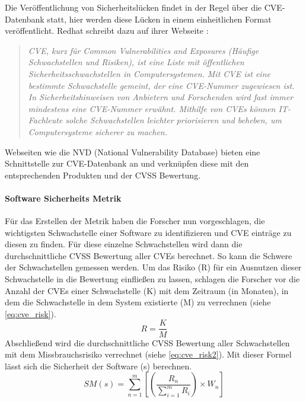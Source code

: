 \documentclass[12pt, a4paper, ngerman]{article}
\begin{document}
Die Veröffentlichung von Sicherheitslücken findet in der Regel über die CVE-Datenbank statt, 
hier werden diese Lücken in einem einheitlichen Format veröffentlicht.
Redhat schreibt dazu auf ihrer Webseite \cite{Redhat_CVE}: 
\begin{quote}
  \textit{
    CVE, kurz für Common Vulnerabilities and Exposures (Häufige Schwachstellen und Risiken), ist eine Liste mit öffentlichen Sicherheitsschwachstellen in Computersystemen. Mit CVE ist eine bestimmte Schwachstelle gemeint, der eine CVE-Nummer zugewiesen ist.
    In Sicherheitshinweisen von Anbietern und Forschenden wird fast immer mindestens eine CVE-Nummer erwähnt. Mithilfe von CVEs können IT-Fachleute solche Schwachstellen leichter priorisieren und beheben, um Computersysteme sicherer zu machen.
  } 
\end{quote}
Webseiten wie die NVD (National Vulnerability Database) bieten eine Schnittstelle zur CVE-Datenbank an und 
verknüpfen diese mit den entsprechenden Produkten und der CVSS Bewertung.

\paragraph{Software Sicherheits Metrik}

Für das Erstellen der Metrik haben die Forscher nun vorgeschlagen, 
die wichtigsten Schwachstelle einer Software zu identifizieren und CVE einträge zu diesen zu finden.
Für diese einzelne Schwachstellen wird dann die durchschnittliche CVSS Bewertung aller CVEs berechnet.
So kann die Schwere der Schwachstellen gemessen werden.
Um das Risiko (R) für ein Ausnutzen dieser Schwachstelle in die Bewertung einfließen zu lassen, 
schlagen die Forscher vor die Anzahl der CVEs einer Schwachstelle (K) mit dem Zeitraum (in Monaten), in dem die Schwachstelle in dem System existierte (M) zu verrechnen (siehe \ref{eq:cve_risk}).
\begin{equation} \label{eq:cve_risk}
  R = \frac{ K }{ M }
\end{equation}
Abschließend wird die durchschnittliche CVSS Bewertung aller Schwachstellen mit dem Missbrauchsrisiko verrechnet (siehe \ref{eq:cve_risk2}).
Mit dieser Formel lässt sich die Sicherheit der Software (s) berechnen.
\begin{equation} \label{eq:cve_risk2}
  SM \left( s \right) = \sum_{ n=1 }^{ m }{ \left[ \left( \frac{ R_{ n } }{ \sum_{ i=1 }^{ m }{ R_{ i } } } \right) \times W_{ n } \right] }
\end{equation}
\end{document}
